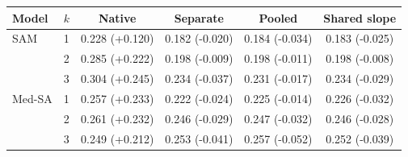 \begin{tabular}{llcccc}
\toprule
Model & $k$ & Native & Separate & Pooled & Shared slope \\
\midrule
SAM & 1 & 0.228 (+0.120) & 0.182 (-0.020) & 0.184 (-0.034) & 0.183 (-0.025) \\
 & 2 & 0.285 (+0.222) & 0.198 (-0.009) & 0.198 (-0.011) & 0.198 (-0.008) \\
 & 3 & 0.304 (+0.245) & 0.234 (-0.037) & 0.231 (-0.017) & 0.234 (-0.029) \\
\midrule
Med-SA & 1 & 0.257 (+0.233) & 0.222 (-0.024) & 0.225 (-0.014) & 0.226 (-0.032) \\
 & 2 & 0.261 (+0.232) & 0.246 (-0.029) & 0.247 (-0.032) & 0.246 (-0.028) \\
 & 3 & 0.249 (+0.212) & 0.253 (-0.041) & 0.257 (-0.052) & 0.252 (-0.039) \\
\bottomrule
\end{tabular}
